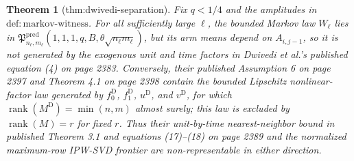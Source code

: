 \documentclass{article}
\newtheorem{theorem}{Theorem}
\begin{document}
\begin{theorem}[thm:dwivedi-separation]\label{thm:dwivedi-separation}
Fix \(q<1/4\) and the amplitudes in \(\mathrm{def:markov\mbox{-}witness}\). For all sufficiently large \(\ell\), the bounded Markov law \(W_\ell\) lies in \(\mathfrak P^{\mathrm{pred}}_{n_\ell,m_\ell}(1,1,1,q,B,\theta\sqrt{n_\ell m_\ell})\), but its arm means depend on \(A_{i,j-1}\), so it is not generated by the exogenous unit and time factors in Dwivedi et al.'s published equation (4) on page 2383. Conversely, their published Assumption 6 on page 2397 and Theorem 4.1 on page 2398 contain the bounded Lipschitz nonlinear-factor law generated by \(f^{\mathrm D}_0\), \(f^{\mathrm D}_1\), \(u^{\mathrm D}\), and \(v^{\mathrm D}\), for which \(\operatorname{rank}(M^{\mathrm D})=\min(n,m)\) almost surely; this law is excluded by \(\operatorname{rank}(M)=r\) for fixed \(r\). Thus their unit-by-time nearest-neighbor bound in published Theorem 3.1 and equations (17)--(18) on page 2389 and the normalized maximum-row IPW-SVD frontier are non-representable in either direction.
\end{theorem}
\end{document}
